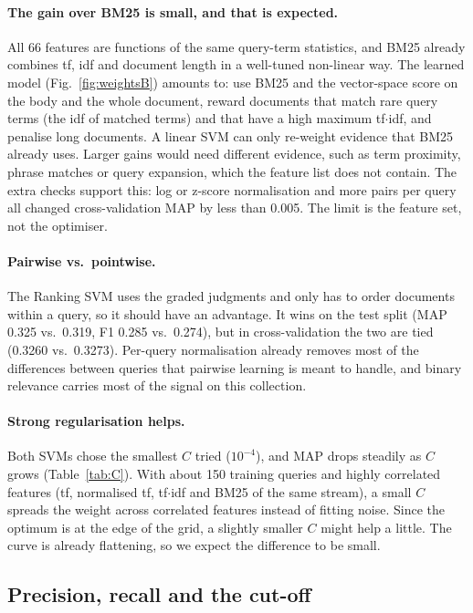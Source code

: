 \documentclass[11pt,a4paper]{article}
\begin{document}
\paragraph{The gain over BM25 is small, and that is expected.} All 66 features are functions
of the same query-term statistics, and BM25 already combines tf, idf and document length in
a well-tuned non-linear way. The learned model (Fig.~\ref{fig:weightsB}) amounts to: use
BM25 and the vector-space score on the body and the whole document, reward documents that
match rare query terms (the idf of matched terms) and that have a high maximum tf$\cdot$idf,
and penalise long documents. A linear SVM can only re-weight evidence that BM25 already
uses. Larger gains would need different evidence, such as term proximity, phrase matches or
query expansion, which the feature list does not contain. The extra checks support this:
log or z-score normalisation and more pairs per query all changed cross-validation MAP by
less than 0.005. The limit is the feature set, not the optimiser.

\paragraph{Pairwise vs.\ pointwise.} The Ranking SVM uses the graded judgments and only has
to order documents within a query, so it should have an advantage. It wins on the test split
(MAP 0.325 vs.\ 0.319, F1 0.285 vs.\ 0.274), but in cross-validation the two are tied
(0.3260 vs.\ 0.3273). Per-query normalisation already removes most of the differences
between queries that pairwise learning is meant to handle, and binary relevance carries most
of the signal on this collection.

\paragraph{Strong regularisation helps.} Both SVMs chose the smallest $C$ tried
($10^{-4}$), and MAP drops steadily as $C$ grows (Table~\ref{tab:C}). With about 150
training queries and highly correlated features (tf, normalised tf, tf$\cdot$idf and BM25 of
the same stream), a small $C$ spreads the weight across correlated features instead of
fitting noise. Since the optimum is at the edge of the grid, a slightly smaller $C$ might
help a little. The curve is already flattening, so we expect the difference to be small.

\subsection{Precision, recall and the cut-off}
\end{document}
